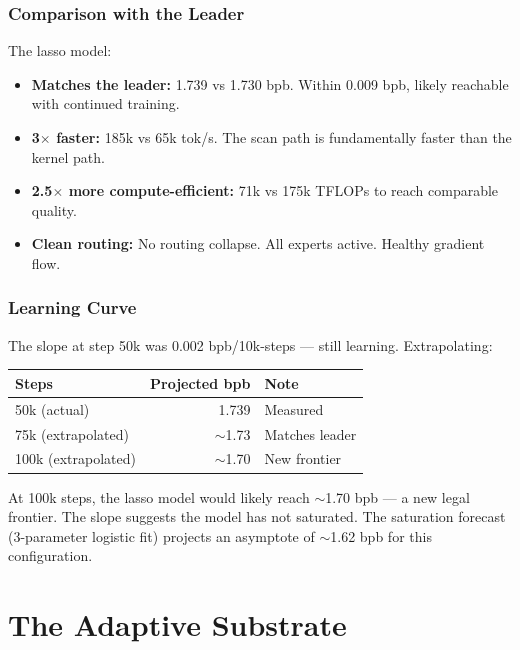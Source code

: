 \documentclass[11pt,a4paper]{report}
\begin{document}
\section{Comparison with the Leader}

The lasso model:
\begin{itemize}[nosep]
\item \textbf{Matches the leader:} 1.739 vs 1.730 bpb. Within 0.009 bpb, likely reachable with continued training.
\item \textbf{3$\times$ faster:} 185k vs 65k tok/s. The scan path is fundamentally faster than the kernel path.
\item \textbf{2.5$\times$ more compute-efficient:} 71k vs 175k TFLOPs to reach comparable quality.
\item \textbf{Clean routing:} No routing collapse. All experts active. Healthy gradient flow.
\end{itemize}

\section{Learning Curve}

The slope at step 50k was 0.002 bpb/10k-steps --- still learning. Extrapolating:

\begin{center}
\begin{tabular}{lrl}
\toprule
Steps & Projected bpb & Note \\
\midrule
50k (actual) & 1.739 & Measured \\
75k (extrapolated) & $\sim$1.73 & Matches leader \\
100k (extrapolated) & $\sim$1.70 & New frontier \\
\bottomrule
\end{tabular}
\end{center}

At 100k steps, the lasso model would likely reach $\sim$1.70 bpb --- a new legal frontier. The slope suggests the model has not saturated. The saturation forecast (3-parameter logistic fit) projects an asymptote of $\sim$1.62 bpb for this configuration.


\part{The Adaptive Substrate}
\label{part:adaptive}
\end{document}
